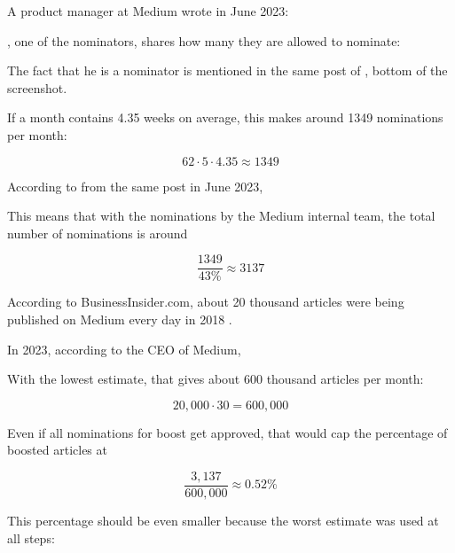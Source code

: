 A product manager at Medium wrote in June 2023:


\MrMcCarty, one of the nominators, shares how many they are allowed to nominate:


The fact that he is a nominator is mentioned in the same post of \MrsStallingsT
{}, bottom of the screenshot.

If a month contains 4.35 weeks on average, this makes around 1349 nominations per month:

\[
    62 \cdot 5 \cdot 4.35 \approx 1349
\]

According to \MrsStallings from the same post in June 2023,


This means that with the nominations by the Medium internal team,
the total number of nominations is around

\[
    \frac{1349}{43\%} \approx 3137
\]

According to BusinessInsider.com,
about 20 thousand articles were being published on Medium every day in 2018 .

In 2023, according to the CEO of Medium,


With the lowest estimate, that gives about 600 thousand articles per month:

\[
    20,000 \cdot 30 = 600,000
\]

Even if all nominations for boost get approved, that would cap the percentage of boosted articles at

\[
    \frac{3,137}{600,000} \approx 0.52\%
\]

This percentage should be even smaller because the worst estimate was used at all steps:

